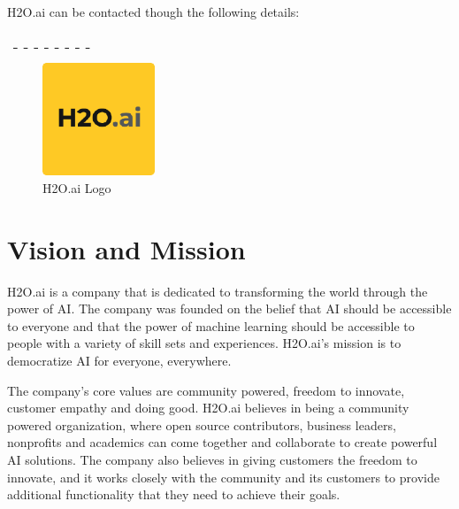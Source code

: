\documentclass[12pt,a4paper]{report}
\begin{document}
H2O.ai can be contacted though the following details: \\
\begin{center}

\href{https://gitter.im/h2oai/h2o-3}{ \Large {}} \ \href{https://www.linkedin.com/company/h2oai/}{ \Large {}} \ \href{https://twitter.com/h2oai}{ \Large {}} \ \href{https://www.facebook.com/h2oai/}{ \Large {}} \ \href{https://www.youtube.com/channel/UC0ZQX4J8AmOwuGZT0IKOJyg}{ \Large {}} \ \href{https://www.instagram.com/h2oai/}{ \Large {}} \ \href{https://www.h2o.ai/}{ \Large {}} \ \href{https://www.h2o.ai/contact-us/}{ \Large {}} \ \href{https://www.h2o.ai/}{ \Large {}} \ \href{https://www.h2o.ai/}{ \Large {}} \\

\end{center}
\begin{figure}[htbp]
\centering
\includegraphics[width=0.3\textwidth]{h2oai.png}
\caption{H2O.ai Logo}
\end{figure}

\section{Vision and Mission}
H2O.ai is a company that is dedicated to transforming the world through the power of \ac{AI}. The company was founded on the belief that AI should be accessible to everyone and that the power of machine learning should be accessible to people with a variety of skill sets and experiences. H2O.ai's mission is to democratize AI for everyone, everywhere. 

The company's core values are community powered, freedom to innovate, customer empathy and doing good. H2O.ai believes in being a community powered organization, where open source contributors, business leaders, nonprofits and academics can come together and collaborate to create powerful AI solutions. The company also believes in giving customers the freedom to innovate, and it works closely with the community and its customers to provide additional functionality that they need to achieve their goals. 
\end{document}
